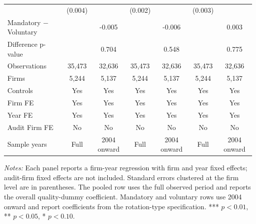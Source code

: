 \begin{table}[htbp]
\begin{threeparttable}
{\begin{tabular}{l cc cc cc}
 & (0.004) &  & (0.002) &  & (0.003) &  \\
Mandatory $-$ Voluntary &  & -0.005 &  & -0.006 &  & 0.003 \\
Difference p-value &  & 0.704 &  & 0.548 &  & 0.775 \\
Observations & 35,473 & 32,636 & 35,473 & 32,636 & 35,473 & 32,636 \\
Firms & 5,244 & 5,137 & 5,244 & 5,137 & 5,244 & 5,137 \\
\midrule
Controls & Yes & Yes & Yes & Yes & Yes & Yes \\
Firm FE & Yes & Yes & Yes & Yes & Yes & Yes \\
Year FE & Yes & Yes & Yes & Yes & Yes & Yes \\
Audit Firm FE & No & No & No & No & No & No \\
Sample years & Full & 2004 onward & Full & 2004 onward & Full & 2004 onward \\
\bottomrule
\end{tabular}}
\begin{tablenotes}\footnotesize
\item \textit{Notes:} Each panel reports a firm-year regression with firm and year fixed effects; audit-firm fixed effects are not included. Standard errors clustered at the firm level are in parentheses. The pooled row uses the full observed period and reports the overall quality-dummy coefficient. Mandatory and voluntary rows use 2004 onward and report coefficients from the rotation-type specification. *** \(p<0.01\), ** \(p<0.05\), * \(p<0.10\).
\end{tablenotes}
\end{threeparttable}
\end{table}
